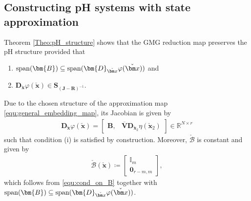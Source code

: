 \documentclass{article}
\newcommand{\bmV}{\bm{V}}
\newcommand{\bmB}{\bm{B}}
\newcommand{\bmD}{\bm{D}}
\newcommand{\R}{\mathbb{R}}
\newcommand{\stateRed}{\check{\bm x}}
\newcommand{\bzero}{\mathbf{0}}
\newcommand{\portsize}{m}
\newcommand{\FOMsize}{N}
\newcommand{\ROMsize}{r}
\newcommand{\Vbar}{\overline{\bmV}}
\newcommand{\approxfunc}{\varphi}
\newcommand{\decfunc}{\eta}
\newcommand{\matset}{\mathbf{S}}
\newcommand{\funcJ}{\bm{J}}
\newcommand{\funcR}{\bm{R}}
\newcommand{\funcBr}{\check{\mathcal{B}}}
\newcommand{\JacRed}{\bmD_{\stateRed}\approxfunc(\stateRed)}
\newcommand{\pH}{\textsf{pH}\xspace}
\newcommand{\GMG}{\textsf{GMG}\xspace}
\begin{document}
\subsection{Constructing \pH systems with state approximation}
								Theorem \ref{Theo:pH_structure} shows that the \GMG reduction map preserves the \pH structure provided that
\begin{enumerate}
	\item[(i)] ${\rm span}(\bmB)\subseteq {\rm span}(\JacRed)$ and 
	\item[(ii)] $\bmD_{\stateRed}\approxfunc(\stateRed)\in\matset_{\left(\funcJ-\funcR \right)^{-1}}$. 
\end{enumerate}
Due to the chosen structure of the approximation map \eqref{equ:general_embedding_map}, its Jacobian is given by
\begin{align}\label{eq:jac_approxfunc}
\bmD_{\stateRed}\approxfunc(\stateRed) = 
								\begin{bmatrix}
									\bmB,& \Vbar\bmD_{\stateRed_2}\decfunc(\stateRed_2)
								\end{bmatrix}\in \R^{\FOMsize \times \ROMsize}
\end{align}								
such that condition (i) is satisfied by construction. Moreover, $\funcBr$ is constant and given by 
\begin{align*}
\funcBr(\stateRed)\coloneq
								\begin{bmatrix}
									\mathbb{I}_{\portsize}\\
									\bzero_{\ROMsize-\portsize,\portsize}
								\end{bmatrix}, 
\end{align*}								
which follows from \eqref{equ:cond_on_B} together with ${\rm span}(\bmB)\subseteq {\rm span}(\JacRed)$.


\end{document}
